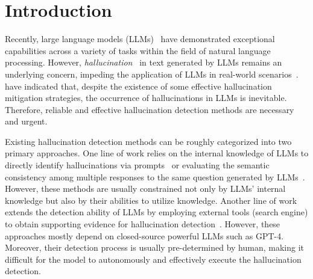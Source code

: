 \section{Introduction}

Recently, large language models (LLMs)~\cite{zhao2023survey} have demonstrated exceptional capabilities across a variety of tasks within the field of natural language processing. However, \emph{hallucination}~\cite{ji2023survey, rawte2023survey, zhang2023siren, huang2023survey, ye2023cognitive} in text generated by LLMs remains an underlying concern, impeding the application of LLMs in real-world scenarios~\cite{kaddour2023challenges}.
\citet{xu2024hallucination} have indicated that, despite the existence of some effective hallucination mitigation strategies, the occurrence of hallucinations in LLMs is inevitable. Therefore, reliable and effective hallucination detection methods are necessary and urgent.

Existing hallucination detection methods can be roughly categorized into two primary approaches. 
One line of work relies on the internal knowledge of LLMs to directly identify hallucinations via prompts~\cite{li2023halueval, lei2023chain} or evaluating the semantic consistency among multiple responses to the same question generated by LLMs~\cite{manakul2023selfcheckgpt}. 
However, these methods are usually constrained not only by LLMs' internal knowledge but also by their abilities to utilize knowledge.
Another line of work extends the detection ability of LLMs by employing external tools (\eg search engine) to obtain supporting evidence for hallucination detection~\cite{chern2023factool, wei2024long, min2023factscore}. However, these approaches mostly depend on closed-source powerful LLMs such as GPT-4. Moreover, their detection process is usually pre-determined by human, making it difficult for the model to autonomously and effectively execute the hallucination detection. 


